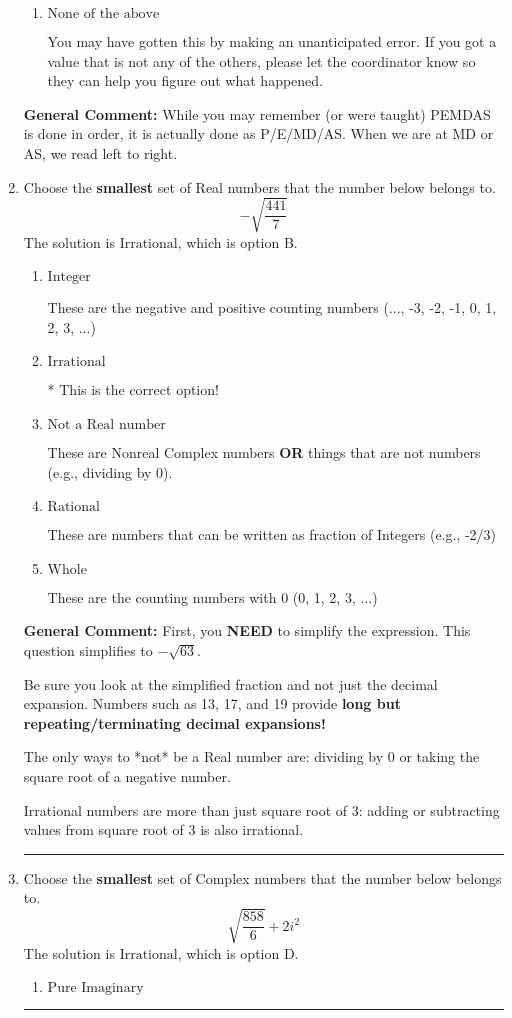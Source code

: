 \documentclass{extbook}[14pt]
\newcommand{\litem}[1]{\item #1

\rule{\textwidth}{0.4pt}}
\begin{document}
\begin{enumerate}
{\begin{enumerate}[label=\Alph*.]
 -1178.667, which corresponds to not distributing a negative correctly.
\item \( \text{None of the above} \)

 You may have gotten this by making an unanticipated error. If you got a value that is not any of the others, please let the coordinator know so they can help you figure out what happened.
\end{enumerate}

\textbf{General Comment:} While you may remember (or were taught) PEMDAS is done in order, it is actually done as P/E/MD/AS. When we are at MD or AS, we read left to right.
}
\litem{
Choose the \textbf{smallest} set of Real numbers that the number below belongs to.
\[ -\sqrt{\frac{441}{7}} \]The solution is \( \text{Irrational} \), which is option B.\begin{enumerate}[label=\Alph*.]
\item \( \text{Integer} \)

These are the negative and positive counting numbers (..., -3, -2, -1, 0, 1, 2, 3, ...)
\item \( \text{Irrational} \)

* This is the correct option!
\item \( \text{Not a Real number} \)

These are Nonreal Complex numbers \textbf{OR} things that are not numbers (e.g., dividing by 0).
\item \( \text{Rational} \)

These are numbers that can be written as fraction of Integers (e.g., -2/3)
\item \( \text{Whole} \)

These are the counting numbers with 0 (0, 1, 2, 3, ...)
\end{enumerate}

\textbf{General Comment:} First, you \textbf{NEED} to simplify the expression. This question simplifies to $-\sqrt{63}$. 
 
 Be sure you look at the simplified fraction and not just the decimal expansion. Numbers such as 13, 17, and 19 provide \textbf{long but repeating/terminating decimal expansions!} 
 
 The only ways to *not* be a Real number are: dividing by 0 or taking the square root of a negative number. 
 
 Irrational numbers are more than just square root of 3: adding or subtracting values from square root of 3 is also irrational.
}
\litem{
Choose the \textbf{smallest} set of Complex numbers that the number below belongs to.
\[ \sqrt{\frac{858}{6}}+2i^2 \]The solution is \( \text{Irrational} \), which is option D.\begin{enumerate}[label=\Alph*.]
\item \( \text{Pure Imaginary} \)


\end{enumerate}}
\end{enumerate}
\end{document}
